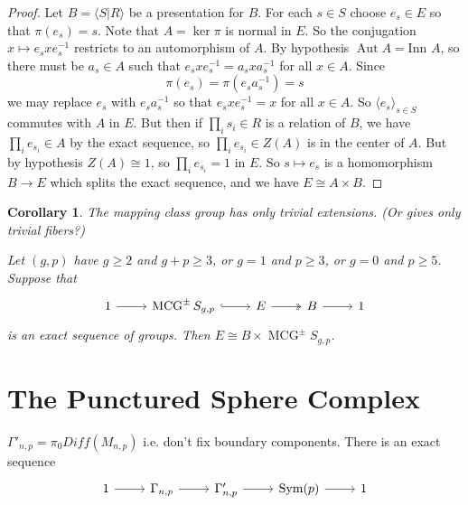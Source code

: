 \documentclass[11pt]{article}
\DeclareMathOperator{\mcg}{MCG}
\DeclareMathOperator{\aaut}{Aut}
\newtheorem{corollary}[theorem]{Corollary}
\theoremstyle{remark}
\theoremstyle{definition}
\begin{document}
\begin{proof}
Let $B = \langle S | R \rangle$
be a presentation for $B$.
For each $s\in S$ choose $e_s \in E$
so that $\pi(e_s) =s$.
Note that $A = \ker \pi$ is normal in $E$.
So the conjugation
$x \mapsto e_s x e_s^{-1}$
restricts to an automorphism of $A$.
By hypothesis $\aaut A = \mbox{Inn } A$,
so there must be $a_s \in A$ such that
$e_sx e_s^{-1} =a_s x a_s^{-1}$ for all $x \in A$.
Since
$$
\pi (e_s) = \pi (e_sa^{-1}_s) = s
$$
we may replace $e_s$ with $e_sa^{-1}_s$
so that $e_sxe^{-1}_s = x$ for all $x \in A$.
So $\langle e_s \rangle_{s \in S}$ commutes with $A$ in $E$.
But then if $\prod_i s_i \in R$ is a relation of $B$,
we have $\prod_i e_{s_i}  \in A$ by the exact sequence,
so $\prod_i e_{s_i} \in Z(A)$ is in the center of $A$.
But by hypothesis $Z(A) \cong 1$, so $\prod_i e_{s_i}=1$ in $E$.
So $s \mapsto e_s$ is a homomorphism $B \to E$ which splits the exact sequence,
and we have $E \cong A \times B$.
\end{proof}

\begin{corollary} The mapping class group has only trivial extensions.
  (Or gives only trivial fibers?)

  Let $(g,p)$ have $g\geq 2$ and $g+p \geq 3$,
  or $g=1$ and $p\geq 3$, or $g=0$ and $p \geq 5$.
  Suppose that
  $$
  \begin{tikzcd}
    1 \arrow[r] &
    \mcg^{\pm} S_{g,p} \arrow[hook,r]&
    E \arrow[two heads]{r}&
    B \arrow[r]&
    1
  \end{tikzcd}
  $$
  is an exact sequence of groups.
  Then $E \cong B \times \mcg^{\pm} S_{g,p}$.
\end{corollary}

\section{The Punctured Sphere Complex}


$\Gamma'_{n,p} =\pi_0 Diff(M_{n,p})$ i.e. don't fix boundary components.
There is an exact sequence
$$
\begin{tikzcd}
1 \arrow[r]&
\Gamma_{n,p} \arrow[r]&
\Gamma'_{n,p}  \arrow[r]&
\mbox{Sym}(p) \arrow[r]&
1
\end{tikzcd}
$$
\end{document}
